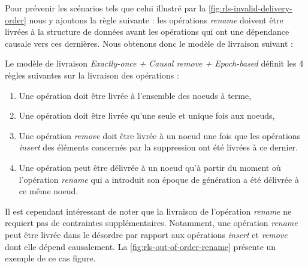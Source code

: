 Pour prévenir les scénarios tels que celui illustré par la \autoref{fig:rls-invalid-delivery-order} nous y ajoutons la règle suivante : les opérations \emph{rename} doivent être livrées à la structure de données avant les opérations qui ont une dépendance causale vers ces dernières.
Nous obtenons donc le modèle de livraison suivant :

\begin{definition}
  \label{def:rls-delivery-model}
  Le modèle de livraison \emph{Exactly-once + Causal remove + Epoch-based} définit les 4 règles suivantes sur la livraison des opérations :
  \begin{enumerate}
    \item Une opération doit être livrée à l'ensemble des noeuds à terme,
    \item Une opération doit être livrée qu'une seule et unique fois aux noeuds,
    \item Une opération \emph{remove} doit être livrée à un noeud une fois que les opérations \emph{insert} des éléments concernés par la suppression ont été livrées à ce dernier.
    \item Une opération peut être délivrée à un noeud qu'à partir du moment où l'opération \emph{rename} qui a introduit son époque de génération a été délivrée à ce même noeud.
  \end{enumerate}
\end{definition}

Il est cependant intéressant de noter que la livraison de l'opération \emph{rename} ne requiert pas de contraintes supplémentaires.
Notamment, une opération \emph{rename} peut être livrée dans le désordre par rapport aux opérations \emph{insert} et \emph{remove} dont elle dépend causalement.
La \autoref{fig:rls-out-of-order-rename} présente un exemple de ce cas figure.

